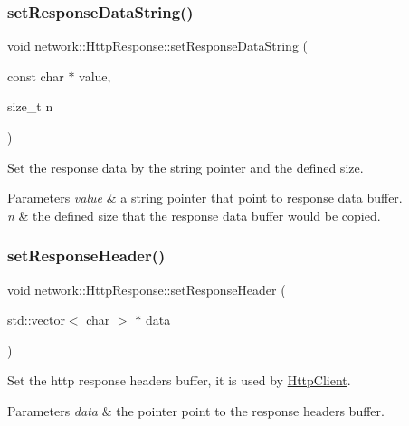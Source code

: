 \subsubsection{\texorpdfstring{set\+Response\+Data\+String()}{setResponseDataString()}\hspace{0.1cm}{\footnotesize\ttfamily [2/2]}}
{\footnotesize\ttfamily void network\+::\+Http\+Response\+::set\+Response\+Data\+String (\begin{DoxyParamCaption}\item[{const char $\ast$}]{value,  }\item[{size\+\_\+t}]{n }\end{DoxyParamCaption})\hspace{0.3cm}{\ttfamily [inline]}}

Set the response data by the string pointer and the defined size. 
\begin{DoxyParams}{Parameters}
{\em value} & a string pointer that point to response data buffer. \\
\hline
{\em n} & the defined size that the response data buffer would be copied. \\
\hline
\end{DoxyParams}
\mbox{\label{classnetwork_1_1HttpResponse_a31318c91d033c09d4d54aa00edf9d5fb}} 
\subsubsection{\texorpdfstring{set\+Response\+Header()}{setResponseHeader()}\hspace{0.1cm}{\footnotesize\ttfamily [1/2]}}
{\footnotesize\ttfamily void network\+::\+Http\+Response\+::set\+Response\+Header (\begin{DoxyParamCaption}\item[{std\+::vector$<$ char $>$ $\ast$}]{data }\end{DoxyParamCaption})\hspace{0.3cm}{\ttfamily [inline]}}

Set the http response headers buffer, it is used by \hyperlink{classnetwork_1_1HttpClient}{Http\+Client}. 
\begin{DoxyParams}{Parameters}
{\em data} & the pointer point to the response headers buffer. \\
\hline
\end{DoxyParams}
\mbox{\label{classnetwork_1_1HttpResponse_a31318c91d033c09d4d54aa00edf9d5fb}} 
